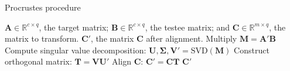 \begin{algorithm}
    \caption{Procrustes procedure}
    \label{alg:Procrustes}
    
    \begin{algorithmic}[1]
        \REQUIRE $\mathbf{A} \in \mathbb{R}^{c \times q}$, the target matrix; $\mathbf{B} \in \mathbb{R}^{c \times q}$, the testee matrix; and $\mathbf{C} \in \mathbb{R}^{m \times q}$, the matrix to transform.
        \ENSURE $\mathbf{C}'$, the matrix $\mathbf{C}$ after alignment.
        \STATE Multiply $\mathbf{M} = \mathbf{A}' \mathbf{B}$
        \STATE Compute singular value decomposition: $\mathbf{U}, \boldsymbol{\Sigma}, \mathbf{V}' = \text{SVD}(\mathbf{M})$
        \STATE Construct orthogonal matrix: $\mathbf{T} = \mathbf{V} \mathbf{U}'$
        \STATE Align $\mathbf{C}$: $\mathbf{C}' = \mathbf{CT}$
        \RETURN $\mathbf{C}'$
    \end{algorithmic}
\end{algorithm}